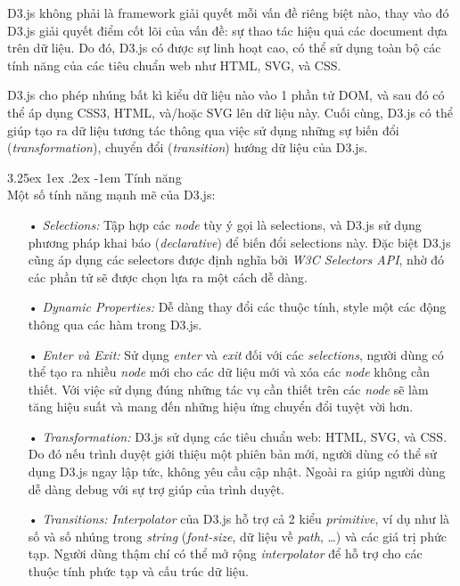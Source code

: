 \documentclass[12pt,a4paper,twoside]{article}
\makeatletter
\newcommand{\myparagraph}[1]{\paragraph{#1}\mbox{}\\} %
\renewcommand\paragraph{\@startsection{paragraph}{5}{\z@}%
  {3.25ex \@plus1ex \@minus.2ex}%
  {-1em}%
  {\normalfont\normalsize\bfseries}}
\makeatother
\begin{document}
D3.js không phải là framework giải quyết mỗi vấn đề riêng biệt nào, thay vào đó D3.js giải quyết điểm cốt lõi của vấn đề: sự thao tác hiệu quả các document dựa trên dữ liệu. Do đó, D3.js có được sự linh hoạt cao, có thể sử dụng toàn bộ các tính năng của các tiêu chuẩn web như HTML, SVG, và CSS.

D3.js cho phép nhúng bất kì kiểu dữ liệu nào vào 1 phần tử DOM, và sau đó có thể áp dụng CSS3, HTML, và/hoặc SVG lên dữ liệu này. Cuối cùng, D3.js có thể giúp tạo ra dữ liệu tương tác thông qua việc sử dụng những sự biến đổi (\textit{transformation}), chuyển đổi (\textit{transition}) hướng dữ liệu của D3.js.

\myparagraph{Tính năng}
Một số tính năng mạnh mẽ của D3.js:
\begin{itemize}
\item[•] \emph{Selections:} Tập hợp các \textit{node} tùy ý gọi là selections, và D3.js sử dụng phương pháp khai báo (\textit{declarative}) để biến đổi selections này. Đặc biệt D3.js cũng áp dụng các selectors được định nghĩa bởi \textit{W3C Selectors API}, nhờ đó các phần tử sẽ được chọn lựa ra một cách dễ dàng.
\item[•] \emph{Dynamic Properties:} Dễ dàng thay đổi các thuộc tính, style một các động thông qua các hàm trong D3.js.
\item[•] \emph{Enter và Exit:} Sử dụng \textit{enter} và \textit{exit} đối với các \textit{selections}, người dùng có thể tạo ra nhiều \textit{node} mới cho các dữ liệu mới và xóa các \textit{node} không cần thiết. Với việc sử dụng đúng những tác vụ cần thiết trên các \textit{node} sẽ làm tăng hiệu suất và mang đến những hiệu ứng chuyển đổi tuyệt vời hơn.
\item[•] \emph{Transformation:} D3.js sử dụng các tiêu chuẩn web: HTML, SVG, và CSS. Do đó nếu trình duyệt giới thiệu một phiên bản mới, người dùng có thể sử dụng D3.js ngay lập tức, không yêu cầu cập nhật. Ngoài ra giúp người dùng dễ dàng debug với sự trợ giúp của trình duyệt.
\item[•] \emph{Transitions:} \textit{Interpolator} của D3.js hỗ trợ cả 2 kiểu \textit{primitive}, ví dụ như là số và số nhúng trong \textit{string} (\textit{font-size}, dữ liệu về \textit{path}, …) và các giá trị phức tạp. Người dùng thậm chí có thể mở rộng \textit{interpolator} để hỗ trợ cho các thuộc tính phức tạp và cấu trúc dữ liệu.
\end{itemize}
\end{document}
